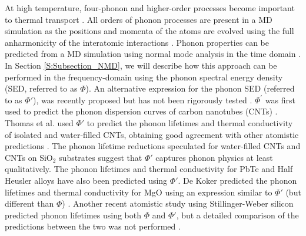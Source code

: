 At high temperature, four-phonon and higher-order processes become 
important to thermal transport 
\cite{wallace_thermodynamics_1972,srivastava_physics_1990,
turney_predicting_2009,esfarjani_heat_2011}. All orders of 
phonon processes are 
present in a MD simulation as the positions and momenta of the atoms are 
evolved using the full 
anharmonicity of the interatomic interactions 
\cite{mcgaughey_quantitative_2004,esfarjani_heat_2011}. Phonon properties 
can be predicted from a MD simulation using normal mode analysis in the 
time domain 
\cite{ladd_lattice_1986,mcgaughey_quantitative_2004,henry_spectral_2008,
turney_predicting_2009,goicochea_thermal_2010,he_thermal_2011}. 
In Section 
\ref{S:Subsection_NMD}, we will describe how this approach can be performed 
in the frequency-domain 
using the phonon spectral energy density (SED, referred to as $\Phi$). An 
alternative expression for 
the phonon SED (referred to as $\Phi'$), was recently proposed but has not 
been rigorously tested 
\cite{maruyama_molecular_2003,shiomi_non-fourier_2006,
thomas_predicting_2010}. $\Phi^{'}$ was first used to 
predict the phonon 
dispersion curves of carbon nanotubes (CNTs) 
\cite{maruyama_molecular_2003}. 
Thomas et al. used $\Phi'$ to 
predict the phonon lifetimes and thermal conductivity of isolated and 
water-filled CNTs, obtaining 
good agreement with other atomistic predictions 
\cite{thomas_predicting_2010}. The phonon lifetime reductions 
speculated for water-filled CNTs
\cite{thomas_predicting_2010} and CNTs on SiO$_2$ 
substrates \cite{ong_reduction_2011} 
suggest that $\Phi'$ captures phonon physics at least qualitatively. The 
phonon lifetimes and thermal 
conductivity for PbTe \cite{qiu_molecular_2011} and Half Heusler alloys 
\cite{shiomi_thermal_2011} have also been predicted 
using $\Phi'$. De Koker predicted the phonon lifetimes and thermal 
conductivity for MgO using an 
expression similar to $\Phi'$ (but different than $\Phi$) 
\cite{dekoker_thermal_2009}. Another recent atomistic 
study using Stillinger-Weber silicon predicted phonon lifetimes using 
both $\Phi$ and $\Phi'$, but a 
detailed comparison of the predictions between the two was not performed 
\cite{hori_mode-dependent_2012}.

